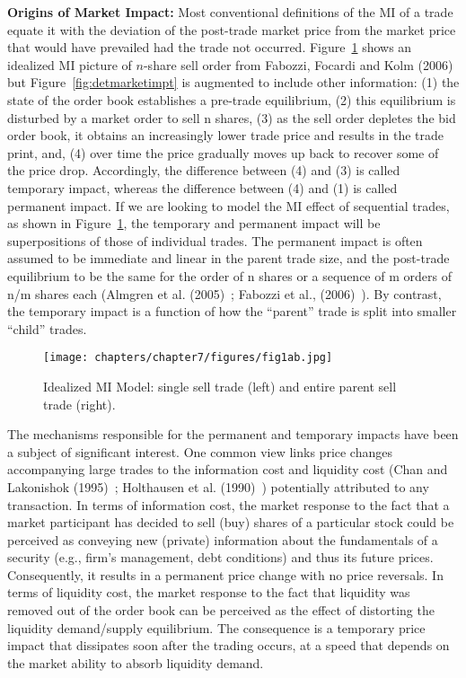 \noindent \textbf{Origins of Market Impact:} Most conventional definitions of the MI of a trade equate it with the deviation of the post-trade market price from the market price that would have prevailed had the trade not occurred. Figure~\ref{fig:marketimpt} shows an idealized MI picture of $n$-share sell order from Fabozzi, Focardi and Kolm (2006)~\cite{ffk} but Figure~\ref{fig:detmarketimpt} is augmented to include other information: (1) the state of the order book establishes a pre-trade equilibrium, (2) this equilibrium is disturbed by a market order to sell n shares, (3) as the sell order depletes the bid order book, it obtains an increasingly lower trade price and results in the trade print, and, (4) over time the price gradually moves up back to recover some of the price drop. Accordingly, the difference between (4) and (3) is called temporary impact, whereas the difference between (4) and (1) is called permanent impact. If we are looking to model the MI effect of sequential trades, as shown in Figure~\ref{fig:marketimpt}, the temporary and permanent impact will be superpositions of those of individual trades. The permanent impact is often assumed to be immediate and linear in the parent trade size, and the post-trade equilibrium to be the same for the order of n shares or a sequence of m orders of n/m shares each (Almgren et al. (2005)~\cite{athl}; Fabozzi et al., (2006)~\cite{ffk}). By contrast, the temporary impact is a function of how the ``parent'' trade is split into smaller ``child'' trades.
	\begin{figure}[!ht]
	\centering
	\texttt{[image: chapters/chapter7/figures/fig1ab.jpg]}
	\caption{Idealized MI Model: single sell trade (left) and entire parent sell trade (right). \label{fig:marketimpt}}
	\end{figure}
The mechanisms responsible for the permanent and temporary impacts have been a subject of significant interest. One common view links price changes accompanying large trades to the information cost and liquidity cost (Chan and Lakonishok (1995)~\cite{chan1995}; Holthausen et al. (1990)~\cite{holthausen1990}) potentially attributed to any transaction. In terms of information cost, the market response to the fact that a market participant has decided to sell (buy) shares of a particular stock could be perceived as conveying new (private) information about the fundamentals of a security (e.g., firm's management, debt conditions) and thus its future prices. Consequently, it results in a permanent price change with no price reversals. In terms of liquidity cost, the market response to the fact that liquidity was removed out of the order book can be perceived as the effect of distorting the liquidity demand/supply equilibrium. The consequence is a temporary price impact that dissipates soon after the trading occurs, at a speed that depends on the market ability to absorb liquidity demand.


